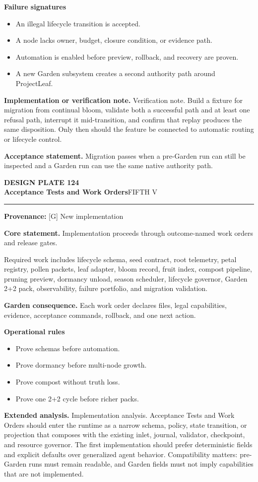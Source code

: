 \documentclass[10pt,letterpaper,oneside]{article}
\newcommand{\prov}[1]{\textcolor{gardenBlue}{\sffamily\footnotesize\textbf{Provenance:} #1}}
\newcommand{\platetitle}[3]{%
  \begin{minipage}[t][0.54in][t]{\textwidth}
  {\sffamily\bfseries\color{gardenDeep}\fontsize{9}{10}\selectfont DESIGN PLATE #1}\\[-1pt]
  {\sffamily\bfseries\color{gardenInk}\fontsize{16.5}{18}\selectfont #2}\hfill{\sffamily\color{gardenGreen}\large #3}
  \end{minipage}\vspace{-2pt}\hrule\vspace{5pt}}
\begin{document}
\textbf{Failure signatures}
\begin{itemize}
\item An illegal lifecycle transition is accepted.
\item A node lacks owner, budget, closure condition, or evidence path.
\item Automation is enabled before preview, rollback, and recovery are proven.
\item A new Garden subsystem creates a second authority path around ProjectLeaf.
\end{itemize}
\textbf{Implementation or verification note.} Verification note. Build a fixture for migration from continual bloom, validate both a successful path and at least one refusal path, interrupt it mid-transition, and confirm that replay produces the same disposition. Only then should the feature be connected to automatic routing or lifecycle control.

\begin{acceptbox}
\textbf{Acceptance statement.} Migration passes when a pre-Garden run can still be inspected and a Garden run can use the same native authority path.
\end{acceptbox}
\newpage
\platetitle{124}{Acceptance Tests and Work Orders}{FIFTH V}
\prov{[G] New implementation}
\fontsize{8.85}{10.45}\selectfont
\begin{corebox}
\textbf{Core statement.} Implementation proceeds through outcome-named work orders and release gates.
\end{corebox}
Required work includes lifecycle schema, seed contract, root telemetry, petal registry, pollen packets, leaf adapter, bloom record, fruit index, compost pipeline, pruning preview, dormancy unload, season scheduler, lifecycle governor, Garden 2+2 pack, observability, failure portfolio, and migration validation.

\textbf{Garden consequence.} Each work order declares files, legal capabilities, evidence, acceptance commands, rollback, and one next action.

\textbf{Operational rules}
\begin{itemize}
\item Prove schemas before automation.
\item Prove dormancy before multi-node growth.
\item Prove compost without truth loss.
\item Prove one 2+2 cycle before richer packs.
\end{itemize}
\textbf{Extended analysis.} Implementation analysis. Acceptance Tests and Work Orders should enter the runtime as a narrow schema, policy, state transition, or projection that composes with the existing inlet, journal, validator, checkpoint, and resource governor. The first implementation should prefer deterministic fields and explicit defaults over generalized agent behavior. Compatibility matters: pre-Garden runs must remain readable, and Garden fields must not imply capabilities that are not implemented.
\end{document}
